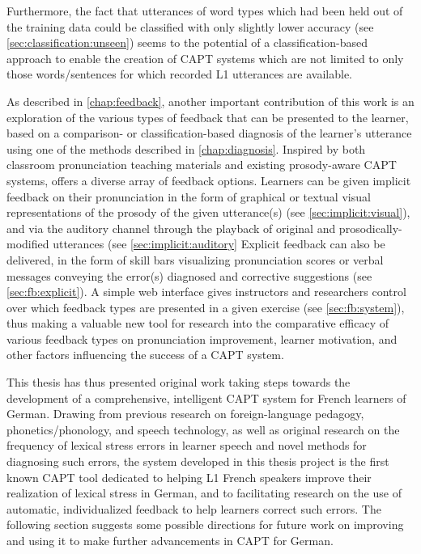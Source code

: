 	Furthermore, the fact that utterances of word types which had been held out of the training data could be classified with only slightly lower accuracy (see \cref{sec:classification:unseen}) seems to  the potential of a classification-based approach to enable the creation of CAPT systems which are not limited to only those words/sentences for which recorded L1 utterances are available.




%
As described in \cref{chap:feedback}, another important contribution of this work is an exploration of the various types of feedback that can be presented to the learner, based on a comparison- or classification-based diagnosis of the learner's utterance using one of the methods described in \cref{chap:diagnosis}. 
	Inspired by both classroom pronunciation teaching materials and existing prosody-aware CAPT systems,  offers a diverse array of feedback options. Learners can be given implicit feedback on their pronunciation in the form of graphical or textual visual representations of the prosody of the given utterance(s) (see \cref{sec:implicit:visual}), and via the auditory channel through the playback of original and prosodically-modified utterances (see \cref{sec:implicit:auditory}
	Explicit feedback can also be delivered, in the form of skill bars visualizing pronunciation scores or verbal messages conveying the error(s) diagnosed and corrective suggestions (see \cref{sec:fb:explicit}).
	A simple web interface gives  instructors and researchers control over which feedback types are presented in a given exercise (see \cref{sec:fb:system}), thus making  a valuable new tool for research into the comparative efficacy of various feedback types on pronunciation improvement, learner motivation, and other factors influencing the success of a CAPT system. 



%
This thesis has thus presented original work taking steps towards the development of a comprehensive, intelligent CAPT system for French learners of German. Drawing from previous research on foreign-language pedagogy, phonetics/phonology, and speech technology, as well as original research on the frequency of lexical stress errors in learner speech and novel methods for diagnosing such errors, the  system developed in this thesis project is the first known CAPT tool dedicated to helping L1 French speakers improve their realization of lexical stress in German, and to facilitating research on the use of automatic, individualized feedback to help learners correct such errors. The following section suggests some possible directions for future work on improving  and using it to make further advancements in CAPT for German.


